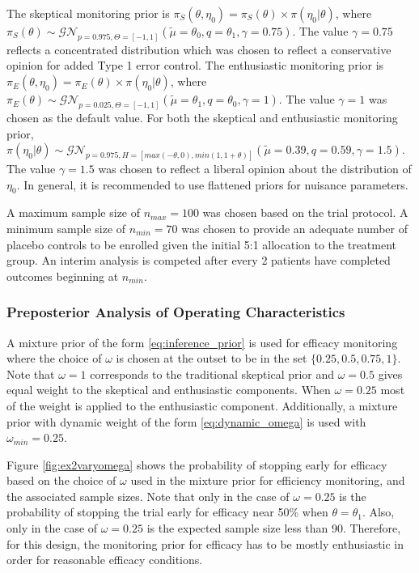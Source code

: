 \documentclass[useAMS,usenatbib,referee]{biom}
\begin{document}
The skeptical monitoring prior is $\pi_S(\theta,\eta_0)=\pi_S(\theta)\times\pi(\eta_0|\theta)$, where $\pi_S(\theta)\sim\mathcal{GN}_{p=0.975,\Theta=[-1,1]}(\tilde{\mu}=\theta_0,q=\theta_1,\gamma=0.75)$. The value $\gamma=0.75$ reflects a concentrated distribution which was chosen to reflect a conservative opinion for added Type 1 error control. The enthusiastic monitoring prior is $\pi_E(\theta,\eta_0)=\pi_E(\theta)\times\pi(\eta_0|\theta)$, where $\pi_E(\theta)\sim\mathcal{GN}_{p=0.025,\Theta=[-1,1]}(\tilde{\mu}=\theta_1,q=\theta_0,\gamma=1)$. The value $\gamma=1$ was chosen as the default value. For both the skeptical and enthusiastic monitoring prior,$\pi(\eta_0|\theta)\sim\mathcal{GN}_{p=0.975,H=[max(-\theta,0),min(1,1+\theta)]}(\tilde{\mu}=0.39,q=0.59,\gamma=1.5)$. The value $\gamma=1.5$ was chosen to reflect a liberal opinion about the distribution of $\eta_0$. In general, it is recommended to use flattened priors for nuisance parameters.

A maximum sample size of $n_{max}=100$ was chosen based on the trial protocol. A minimum sample size of $n_{min}=70$ was chosen to provide an adequate number of placebo controls to be enrolled given the initial 5:1 allocation to the treatment group.
%
An interim analysis is competed after every 2 patients have completed outcomes beginning at $n_{min}$.

\subsubsection{Preposterior Analysis of Operating Characteristics}\label{sec:ex2operatingcharacteristics}
A mixture prior of the form \eqref{eq:inference_prior} is used for efficacy monitoring where the choice of $\omega$ is chosen at the outset to be in the set $\{0.25,0.5,0.75,1\}$. Note that $\omega=1$ corresponds to the traditional skeptical prior and $\omega=0.5$ gives equal weight to the skeptical and enthusiastic components. When $\omega=0.25$ most of the weight is applied to the enthusiastic component. Additionally, a mixture prior with dynamic weight of the form \eqref{eq:dynamic_omega} is used with $\omega_{min}=0.25$.

Figure \ref{fig:ex2varyomega} shows the probability of stopping early for efficacy based on the choice of $\omega$ used in the mixture prior for efficiency monitoring, and the associated sample sizes. Note that only in the case of $\omega=0.25$ is the probability of stopping the trial early for efficacy near 50\% when $\theta=\theta_1$. Also, only in the case of $\omega=0.25$ is the expected sample size less than 90. Therefore, for this design, the monitoring prior for efficacy has to be mostly enthusiastic in order for reasonable efficacy conditions.
\end{document}
